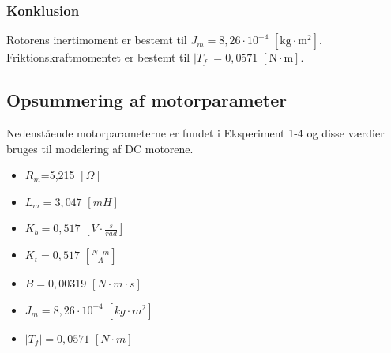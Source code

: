 \subsubsection{Konklusion}
Rotorens inertimoment er bestemt til \(J_m=8,26\cdot10^{-4}\) \([\text{kg}\cdot{\text{m}^2}]\).
Friktionskraftmomentet er bestemt til \(\left| { T }_{ f } \right| =0,0571\) \( [\text{N} \cdot \text{m}]\).

\subsection{Opsummering af motorparameter}
\label{opsummering_af_motorparameter}
Nedenstående motorparameterne er fundet i Eksperiment 1-4 og disse værdier bruges til modelering af DC motorene.
\begin{itemize}
\item \(R_m\)=5,215 \([\Omega]\)
\item \(L_m = 3,047\) \([mH]\) 
\item \(K_b = 0,517\) \(\left[ V\cdot\frac{s}{rad} \right] \)
\item \(K_t = 0,517\) \(\left[ \frac{N\cdot m}{A} \right] \)
\item \(B = 0,00319\) \(\left[  N \cdot m \cdot s\right]  \)
\item \(J_m = 8,26\cdot10^{-4}\) \(\left[ kg\cdot{m^2} \right]  \)
\item \(\left| T _f \right| = 0,0571\) \(\left[ N \cdot m \right]   \)
\end{itemize}
